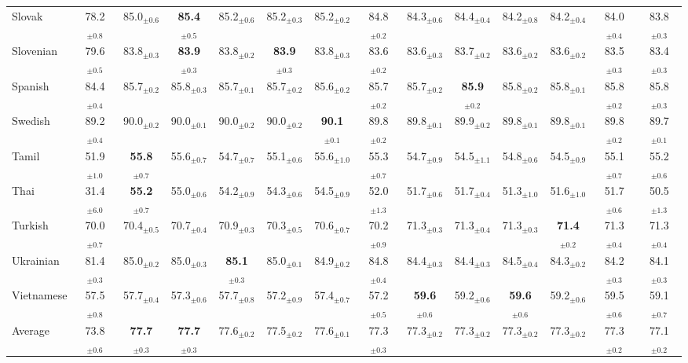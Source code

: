 \begin{table*}[ht]
{\begin{tabular}{lccccccccccccc}
Slovak & 78.2$_{\pm 0.8}$ & 85.0$_{\pm 0.6}$ & \textbf{85.4}$_{\pm 0.5}$ & 85.2$_{\pm 0.6}$ & 85.2$_{\pm 0.3}$ & 85.2$_{\pm 0.2}$ & 84.8$_{\pm 0.2}$ & 84.3$_{\pm 0.6}$ & 84.4$_{\pm 0.4}$ & 84.2$_{\pm 0.8}$ & 84.2$_{\pm 0.4}$ & 84.0$_{\pm 0.4}$ & 83.8$_{\pm 0.3}$ \\
Slovenian & 79.6$_{\pm 0.5}$ & 83.8$_{\pm 0.3}$ & \textbf{83.9}$_{\pm 0.3}$ & 83.8$_{\pm 0.2}$ & \textbf{83.9}$_{\pm 0.3}$ & 83.8$_{\pm 0.3}$ & 83.6$_{\pm 0.2}$ & 83.6$_{\pm 0.3}$ & 83.7$_{\pm 0.2}$ & 83.6$_{\pm 0.2}$ & 83.6$_{\pm 0.2}$ & 83.5$_{\pm 0.3}$ & 83.4$_{\pm 0.3}$ \\
Spanish & 84.4$_{\pm 0.4}$ & 85.7$_{\pm 0.2}$ & 85.8$_{\pm 0.3}$ & 85.7$_{\pm 0.1}$ & 85.7$_{\pm 0.2}$ & 85.6$_{\pm 0.2}$ & 85.7$_{\pm 0.2}$ & 85.7$_{\pm 0.2}$ & \textbf{85.9}$_{\pm 0.2}$ & 85.8$_{\pm 0.2}$ & 85.8$_{\pm 0.1}$ & 85.8$_{\pm 0.2}$ & 85.8$_{\pm 0.3}$ \\
Swedish & 89.2$_{\pm 0.4}$ & 90.0$_{\pm 0.2}$ & 90.0$_{\pm 0.1}$ & 90.0$_{\pm 0.2}$ & 90.0$_{\pm 0.2}$ & \textbf{90.1}$_{\pm 0.1}$ & 89.8$_{\pm 0.2}$ & 89.8$_{\pm 0.1}$ & 89.9$_{\pm 0.2}$ & 89.8$_{\pm 0.1}$ & 89.8$_{\pm 0.1}$ & 89.8$_{\pm 0.2}$ & 89.7$_{\pm 0.1}$ \\
Tamil & 51.9$_{\pm 1.0}$ & \textbf{55.8}$_{\pm 0.7}$ & 55.6$_{\pm 0.7}$ & 54.7$_{\pm 0.7}$ & 55.1$_{\pm 0.6}$ & 55.6$_{\pm 1.0}$ & 55.3$_{\pm 0.7}$ & 54.7$_{\pm 0.9}$ & 54.5$_{\pm 1.1}$ & 54.8$_{\pm 0.6}$ & 54.5$_{\pm 0.9}$ & 55.1$_{\pm 0.7}$ & 55.2$_{\pm 0.6}$ \\
Thai & 31.4$_{\pm 6.0}$ & \textbf{55.2}$_{\pm 0.7}$ & 55.0$_{\pm 0.6}$ & 54.2$_{\pm 0.9}$ & 54.3$_{\pm 0.6}$ & 54.5$_{\pm 0.9}$ & 52.0$_{\pm 1.3}$ & 51.7$_{\pm 0.6}$ & 51.7$_{\pm 0.4}$ & 51.3$_{\pm 1.0}$ & 51.6$_{\pm 1.0}$ & 51.7$_{\pm 0.6}$ & 50.5$_{\pm 1.3}$ \\
Turkish & 70.0$_{\pm 0.7}$ & 70.4$_{\pm 0.5}$ & 70.7$_{\pm 0.4}$ & 70.9$_{\pm 0.3}$ & 70.3$_{\pm 0.5}$ & 70.6$_{\pm 0.7}$ & 70.2$_{\pm 0.9}$ & 71.3$_{\pm 0.3}$ & 71.3$_{\pm 0.4}$ & 71.3$_{\pm 0.3}$ & \textbf{71.4}$_{\pm 0.2}$ & 71.3$_{\pm 0.4}$ & 71.3$_{\pm 0.4}$ \\
Ukrainian & 81.4$_{\pm 0.3}$ & 85.0$_{\pm 0.2}$ & 85.0$_{\pm 0.3}$ & \textbf{85.1}$_{\pm 0.3}$ & 85.0$_{\pm 0.1}$ & 84.9$_{\pm 0.2}$ & 84.8$_{\pm 0.4}$ & 84.4$_{\pm 0.3}$ & 84.4$_{\pm 0.3}$ & 84.5$_{\pm 0.4}$ & 84.3$_{\pm 0.2}$ & 84.2$_{\pm 0.3}$ & 84.1$_{\pm 0.3}$ \\
Vietnamese & 57.5$_{\pm 0.8}$ & 57.7$_{\pm 0.4}$ & 57.3$_{\pm 0.6}$ & 57.7$_{\pm 0.8}$ & 57.2$_{\pm 0.9}$ & 57.4$_{\pm 0.7}$ & 57.2$_{\pm 0.5}$ & \textbf{59.6}$_{\pm 0.6}$ & 59.2$_{\pm 0.6}$ & \textbf{59.6}$_{\pm 0.6}$ & 59.2$_{\pm 0.6}$ & 59.5$_{\pm 0.6}$ & 59.1$_{\pm 0.7}$ \\
\hline
Average & 73.8$_{\pm 0.6}$ & \textbf{77.7}$_{\pm 0.3}$ & \textbf{77.7}$_{\pm 0.3}$ & 77.6$_{\pm 0.2}$ & 77.5$_{\pm 0.2}$ & 77.6$_{\pm 0.1}$ & 77.3$_{\pm 0.3}$ & 77.3$_{\pm 0.2}$ & 77.3$_{\pm 0.2}$ & 77.3$_{\pm 0.2}$ & 77.3$_{\pm 0.2}$ & 77.3$_{\pm 0.2}$ & 77.1$_{\pm 0.2}$ \\


\end{tabular}}
\end{table*}
